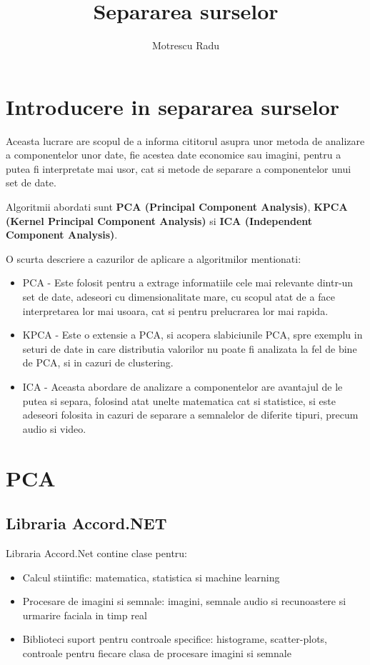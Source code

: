 \documentclass[12pt]{article}
\title{Separarea surselor}
\author{Motrescu Radu}
\date{}
\begin{document}
\maketitle

\newpage

\tableofcontents

\newpage

\section{Introducere in separarea surselor}
Aceasta lucrare are scopul de a informa cititorul asupra unor metoda de analizare a componentelor unor date, fie acestea date economice sau imagini, pentru a putea fi interpretate mai usor, cat si metode de separare a componentelor unui set de date. 

Algoritmii abordati sunt \textbf{PCA (Principal Component Analysis)}, \textbf{KPCA (Kernel Principal Component Analysis)} si \textbf{ICA (Independent Component Analysis)}. 

O scurta descriere a cazurilor de aplicare a algoritmilor mentionati:
\begin{itemize}
	\item{PCA - Este folosit pentru a extrage informatiile cele mai relevante dintr-un set de date, adeseori cu dimensionalitate mare, cu scopul atat de a face interpretarea lor mai usoara, cat si pentru prelucrarea lor mai rapida.}
	\item{KPCA - Este o extensie a PCA, si acopera slabiciunile PCA, spre exemplu in seturi de date in care distributia valorilor nu poate fi analizata la fel de bine de PCA, si in cazuri de clustering.}
	\item{ICA - Aceasta abordare de analizare a componentelor are avantajul de le putea si separa, folosind atat unelte matematica cat si statistice, si este adeseori folosita in cazuri de separare a semnalelor de diferite tipuri, precum audio si video.}
\end{itemize}
\newpage
\section{PCA}
\subsection{Libraria Accord.NET}
Libraria Accord.Net contine clase pentru:
\begin{itemize}
\item Calcul stiintific: matematica, statistica si machine learning
\item Procesare de imagini si semnale: imagini, semnale audio si recunoastere si urmarire faciala in timp real
\item Biblioteci suport pentru controale specifice: histograme, scatter-plots, controale pentru fiecare clasa de procesare imagini si semnale
\end{itemize}
\end{document}
